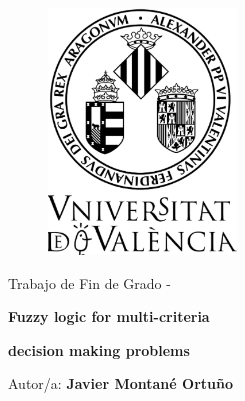 \begin{titlepage}

    \begin{center}
    \vspace*{-1in}
    \begin{figure}[H]
    \begin{center}
    \includegraphics[width=5cm]{Escut.png}
    \end{center}
    \end{figure}
    
    \vspace*{0.5in}
    
    \begin{Huge}
    Trabajo de Fin de Grado - \@date
    
    \vspace*{0.5in}
    
    \textbf{Fuzzy logic for multi-criteria}
    
    \textbf{decision making problems}\\
    \end{Huge}
    
    \vspace*{0.1in}
    
    
    \vspace*{0.2in}
    
    \begin{huge}
    Autor/a: {\bf
    Javier Montané Ortuño} \\
    \end{huge}
    
    \vspace*{0.2in}
    

\end{center}
\end{titlepage}
